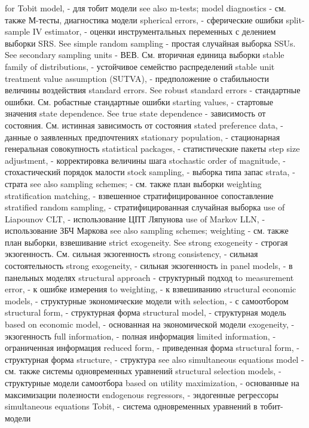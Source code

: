 for Tobit model, - для тобит модели
see also m-tests; model diagnostics - см. также М-тесты, диагностика модели
spherical errors, - сферические ошибки
split-sample IV estimator, - оценки инструментальных переменных с делением выборки
SRS. See simple random sampling - простая случайная выборка
SSUs. See secondary sampling units - ВЕВ. См. вторичная единица выборки
stable family of distributions, - устойчивое семейство распределений
stable unit treatment value assumption (SUTVA), - предположение о стабильности величины воздействия
standard errors. See robust standard errors - стандартные ошибки. См. робастные стандартные ошибки
starting values, - стартовые значения
state dependence. See true state dependence - зависимость от состояния. См. истинная зависимость от состояния
stated preference data, - данные о заявленных предпочтениях
stationary population, - стационарная генеральная совокупность
statistical packages, - статистические пакеты
step size adjustment, - корректировка величины шага
stochastic order of magnitude, - стохастический порядок малости
stock sampling, - выборка типа запас
strata, - страта
see also sampling schemes; - см. также план выборки
weighting stratification matching, - взвешенное стратифицированное сопоставление
stratified random sampling, - стратифицированная случайная выборка
use of Liapounov CLT, - использование ЦПТ Ляпунова
use of Markov LLN, - использование ЗБЧ Маркова
see also sampling schemes; weighting - см. также план выборки, взвешивание
strict exogeneity. See strong exogeneity  - строгая экзогенность. См. сильная экзогенность
strong consistency, - сильная состоятельность
strong exogeneity, - сильная экзогенность
in panel models, - в панельных моделях
structural approach - структурный подход
to measurement error, - к ошибке измерения
to weighting, - к взвешиванию
structural economic models, - структурные экономические модели
with selection, - с самоотбором
structural form, - структурная форма
structural model, - структурная модель
based on economic model, - основанная на экономической модели
exogeneity, - экзогенность
full information, - полная информация
limited information, - ограниченная информация
reduced form, - приведенная форма
structural form, - структурная форма
structure, - структура
see also simultaneous equations model - см. также системы одновременных уравнений
structural selection models, - структурные модели самоотбора
based on utility maximization, - основанные на максимизации полезности
endogenous regressors, - эндогенные регрессоры
simultaneous equations Tobit, - система одновременных уравнений в тобит-модели
